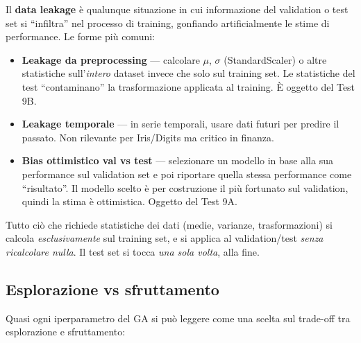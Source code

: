 \documentclass[11pt,a4paper]{article}
\begin{document}
Il \textbf{data leakage} è qualunque situazione in cui informazione del
validation o test set si ``infiltra'' nel processo di training,
gonfiando artificialmente le stime di performance. Le forme più comuni:

\begin{itemize}
    \item \textbf{Leakage da preprocessing} --- calcolare $\mu$, $\sigma$
          (StandardScaler) o altre statistiche sull'\emph{intero} dataset
          invece che solo sul training set. Le statistiche del test
          ``contaminano'' la trasformazione applicata al training. È
          oggetto del Test 9B.
    \item \textbf{Leakage temporale} --- in serie temporali, usare dati
          futuri per predire il passato. Non rilevante per Iris/Digits ma
          critico in finanza.
    \item \textbf{Bias ottimistico val vs test} --- selezionare un modello
          in base alla sua performance sul validation set e poi riportare
          quella stessa performance come ``risultato''. Il modello scelto è
          per costruzione il più fortunato sul validation, quindi la stima
          è ottimistica. Oggetto del Test 9A.
\end{itemize}

\begin{concetto}
Tutto ciò che richiede statistiche dei dati (medie, varianze,
trasformazioni) si calcola \emph{esclusivamente} sul training set, e si
applica al validation/test \emph{senza ricalcolare nulla}. Il test set si
tocca \emph{una sola volta}, alla fine.
\end{concetto}

\subsection{Esplorazione vs sfruttamento}

Quasi ogni iperparametro del GA si può leggere come una scelta sul
trade-off tra esplorazione e sfruttamento:
\end{document}
